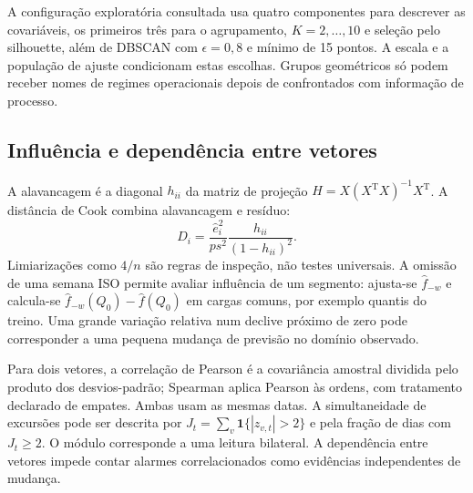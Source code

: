 A configuração exploratória consultada usa quatro componentes para descrever as covariáveis, os primeiros três para o agrupamento, $K=2,\ldots,10$ e seleção pelo silhouette, além de DBSCAN com $\epsilon=0{,}8$ e mínimo de 15 pontos. A escala e a população de ajuste condicionam estas escolhas. Grupos geométricos só podem receber nomes de regimes operacionais depois de confrontados com informação de processo.

\subsection{Influência e dependência entre vetores}
\label{sec:mat-influencia}
A alavancagem é a diagonal $h_{ii}$ da matriz de projeção $H=X(X^{\mathrm T}X)^{-1}X^{\mathrm T}$. A distância de Cook combina alavancagem e resíduo:
\begin{equation}
D_i=\frac{\widehat e_i^2}{p s^2}\frac{h_{ii}}{(1-h_{ii})^2}.
\label{eq:mat-cook}
\end{equation}
Limiarizações como $4/n$ são regras de inspeção, não testes universais. A omissão de uma semana ISO permite avaliar influência de um segmento: ajusta-se $\widehat f_{-w}$ e calcula-se $\widehat f_{-w}(Q_0)-\widehat f(Q_0)$ em cargas comuns, por exemplo quantis do treino. Uma grande variação relativa num declive próximo de zero pode corresponder a uma pequena mudança de previsão no domínio observado.

Para dois vetores, a correlação de Pearson é a covariância amostral dividida pelo produto dos desvios-padrão; Spearman aplica Pearson às ordens, com tratamento declarado de empates. Ambas usam as mesmas datas. A simultaneidade de excursões pode ser descrita por $J_t=\sum_v\mathbf1\{|z_{v,t}|>2\}$ e pela fração de dias com $J_t\geq2$. O módulo corresponde a uma leitura bilateral. A dependência entre vetores impede contar alarmes correlacionados como evidências independentes de mudança.




